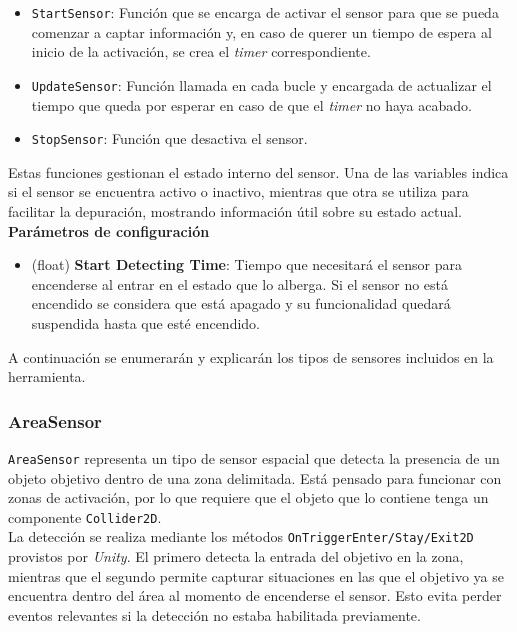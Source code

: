 \begin{itemize}
	\item \texttt{StartSensor}: Función que se encarga de activar el sensor para que se pueda comenzar a captar información y, en caso de querer un tiempo de espera al inicio de la activación, se crea el \textit{timer} correspondiente.
	\item \texttt{UpdateSensor}: Función llamada en cada bucle y encargada de actualizar el tiempo que queda por esperar en caso de que el \textit{timer} no haya acabado.
	\item \texttt{StopSensor}: Función que desactiva el sensor.
\end{itemize}
Estas funciones gestionan el estado interno del sensor. Una de las variables indica si el sensor se encuentra activo o inactivo, mientras que otra se utiliza para facilitar la depuración, mostrando información útil sobre su estado actual.\\

\textbf{Parámetros de configuración}
\begin{itemize}
	\item (float) \textbf{Start Detecting Time}: Tiempo que necesitará el sensor para encenderse al entrar en el estado que lo alberga. Si el sensor no está encendido se considera que está apagado y su funcionalidad quedará suspendida hasta que esté encendido.
\end{itemize}

A continuación se enumerarán y explicarán los tipos de sensores incluidos en la herramienta.\\

\subsubsection{AreaSensor}

\texttt{AreaSensor} representa un tipo de sensor espacial que detecta la presencia de un objeto objetivo dentro de una zona delimitada. Está pensado para funcionar con zonas de activación, por lo que requiere que el objeto que lo contiene tenga un componente \texttt{Collider2D}.\\

La detección se realiza mediante los métodos \texttt{OnTriggerEnter/Stay/Exit2D} provistos por \textit{Unity}. 
El primero detecta la entrada del objetivo en la zona, mientras que el segundo permite capturar situaciones en las que el objetivo ya se encuentra dentro del área al momento de encenderse el sensor. Esto evita perder eventos relevantes si la detección no estaba habilitada previamente.\\

